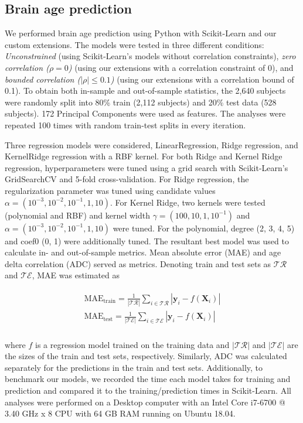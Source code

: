 \documentclass[utf8]{frontiersSCNS} %
\newcommand{\X}{\mathbf{X}}
\newcommand{\y}{\mathbf{y}}
\begin{document}
\subsection{Brain age prediction}\label{sec:brain_age_prediction}

We performed brain age prediction using Python with Scikit-Learn and our custom extensions. The models were tested in three different conditions: \textit{Unconstrained} (using Scikit-Learn's models without correlation constraints), \textit{zero correlation ($\rho=0$)} (using our extensions with a correlation constraint of 0), and \textit{bounded correlation ($|\rho|\le0.1$)} (using our extensions with a correlation bound of 0.1). To obtain both in-sample and out-of-sample statistics, the 2,640 subjects were randomly split into 80\% train (2,112 subjects) and 20\% test data (528 subjects). 172 Principal Components were used as features. The analyses were repeated 100 times with random train-test splits in every iteration.

Three regression models were considered, LinearRegression, Ridge regression, and KernelRidge regression with a RBF kernel. For both Ridge and Kernel Ridge regression, hyperparameters were tuned using a grid search with Scikit-Learn's GridSearchCV and 5-fold cross-validation. 
For Ridge regression, the regularization parameter was tuned using candidate values $\alpha=(10^{-3}, 10^{-2}, 10^{-1}, 1, 10)$. For Kernel Ridge, two kernels were tested (polynomial and RBF) and kernel width $\gamma = (100, 10, 1, 10^{-1})$ and $\alpha = (10^{-3}, 10^{-2}, 10^{-1}, 1, 10)$ were tuned. For the polynomial, degree (2, 3, 4, 5) and  coef0 (0, 1) were additionally tuned. The resultant best model was used to calculate in- and out-of-sample metrics.
Mean absolute error (MAE) and  age delta correlation (ADC) served as metrics. Denoting train and test sets as $\mathcal{TR}$ and $\mathcal{TE}$, MAE was estimated as

\begin{align}
\begin{split}
\text{MAE}_\text{train} = \frac{1}{|\mathcal{TR}|} \sum_{i\in\mathcal{TR}}|\y_i - f(\X_i)|\\
\text{MAE}_\text{test} = \frac{1}{|\mathcal{TE
}|} \sum_{i\in\mathcal{TE}}|\y_i - f(\X_i)|\\
\end{split}
\end{align}

where $f$ is a regression model trained on the training data and  $|\mathcal{TR}|$ and $|\mathcal{TE}|$ are the sizes of the train and test sets, respectively. Similarly, ADC was calculated separately for the predictions in the train and test sets. Additionally, to benchmark our models, we recorded the time each model takes for training and prediction and compared it to the training/prediction times in Scikit-Learn. All analyses were performed on a Desktop computer with an Intel Core i7-6700 @ 3.40 GHz x 8 CPU with 64 GB RAM running on Ubuntu 18.04. 
\end{document}
